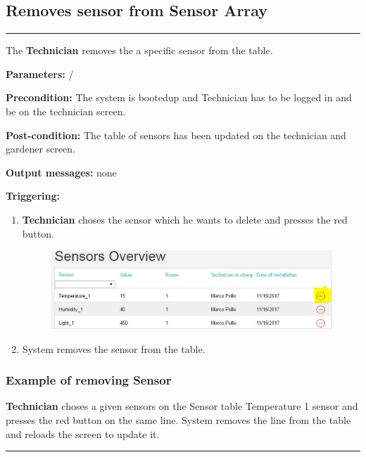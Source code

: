 \subsection{Removes sensor from Sensor Array}

\hrule
\hfill
\vspace{0.5cm}

\label{operation:removesSensor}

The \textbf{Technician} removes the a specific sensor from the table.
\begin{description}

\item \textbf{Parameters:} /
\item \textbf{Precondition:} The system is bootedup and Technician has to be
logged in and be on the technician screen.
\item \textbf{Post-condition:} The table of sensors has been updated on the
technician and gardener screen.
\item \textbf{Output messages:} none
\item \textbf{Triggering:}
\begin{enumerate}
\item \textbf{Technician} choses the sensor which he wants to delete and presses
the red button.
\begin{figure}[H]
\includegraphics[width=1\textwidth]{images/RemoveSensorFromSensorListTechnician.eps}
\end{figure}
\item System removes the sensor from the table.
\end{enumerate}
\end{description}

\subsubsection{Example of removing Sensor}
\textbf{Technician} choses a given sensors on the Sensor table Temperature 1
sensor and presses the red button on the same line.
System removes the line from the table and reloads the screen to update it.

 \hfill
\vspace{0.5cm}
\hrule
